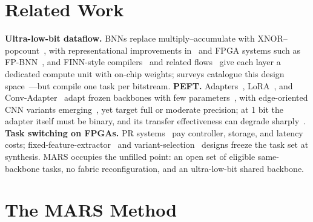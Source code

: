 \documentclass[conference]{IEEEtran}
\begin{document}
\section{Related Work}
\textbf{Ultra-low-bit dataflow.} BNNs replace multiply--accumulate with XNOR--popcount~\cite{Courbariaux2016BinaryConnect,Rastegari2016XNOR,Hubara2016BinarizedNN}, with representational improvements in~\cite{Liu2018BiReal,Liu2020ReActNet} and FPGA systems such as FP-BNN~\cite{Liang2018FPBNN}, and FINN-style compilers~\cite{Umuroglu2017FINN,Blott2018FINNR,Alam2023RTLMVU} and related flows~\cite{Schulte2025hls4ml} give each layer a dedicated compute unit with on-chip weights; surveys catalogue this design space~\cite{Qin2020BNNSurvey,Su2023BNNFPGASurvey,Jiang2025FPGACNNReview,Liu2024LightweightDLSurvey}---but compile one task per bitstream. \textbf{PEFT.} Adapters~\cite{Houlsby2019Adapters}, LoRA~\cite{Hu2022LoRA}, and Conv-Adapter~\cite{Chen2024ConvAdapter} adapt frozen backbones with few parameters~\cite{Belanec2025PEFTBench}, with edge-oriented CNN variants emerging~\cite{Ding2024LoRAC,Kwak2025LoRAEdge}, yet target full or moderate precision; at 1 bit the adapter itself must be binary, and its transfer effectiveness can degrade sharply~\cite{Jie2023PrecisionRedundancy}. \textbf{Task switching on FPGAs.} PR systems~\cite{Huang2024ACNNE,Rangsikunpum2024CoarseToFine} pay controller, storage, and latency costs; fixed-feature-extractor~\cite{Whatmough2019FixyNN} and variant-selection~\cite{ElBouazzaoui2025NeuroAdaptive} designs freeze the task set at synthesis. MARS occupies the unfilled point: an open set of eligible same-backbone tasks, no fabric reconfiguration, and an ultra-low-bit shared backbone.

\section{The MARS Method}
\end{document}
